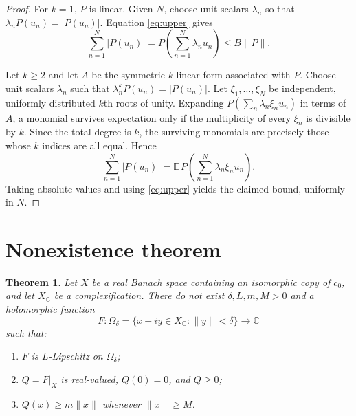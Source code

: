 \documentclass[11pt]{article}
\newtheorem{theorem}{Theorem}
\newcommand{\C}{\mathbb C}
\begin{document}
\begin{proof}
For $k=1$, $P$ is linear.  Given $N$, choose unit scalars $\lambda_n$ so that
$\lambda_nP(u_n)=|P(u_n)|$.  Equation \eqref{eq:upper} gives
\[
 \sum_{n=1}^N|P(u_n)|
 =P\left(\sum_{n=1}^N\lambda_nu_n\right)
 \le B\|P\|.
\]

Let $k\ge2$ and let $A$ be the symmetric $k$-linear form associated with
$P$.  Choose unit scalars $\lambda_n$ such that
$\lambda_n^kP(u_n)=|P(u_n)|$.  Let $\xi_1,\ldots,\xi_N$ be independent,
uniformly distributed $k$th roots of unity.  Expanding
$P(\sum_n\lambda_n\xi_nu_n)$ in terms of $A$, a monomial survives expectation
only if the multiplicity of every $\xi_n$ is divisible by $k$.  Since the
total degree is $k$, the surviving monomials are precisely those whose $k$
indices are all equal.  Hence
\[
 \sum_{n=1}^N|P(u_n)|
 =\mathbb E\,P\left(\sum_{n=1}^N\lambda_n\xi_nu_n\right).
\]
Taking absolute values and using \eqref{eq:upper} yields the claimed bound,
uniformly in $N$.
\end{proof}

\section{Nonexistence theorem}

\begin{theorem}\label{thm:main}
Let $X$ be a real Banach space containing an isomorphic copy of $c_0$, and
let $X_{\C}$ be a complexification.  There do not exist
$\delta,L,m,M>0$ and a holomorphic function
\[
 F:\Omega_\delta=\{x+iy\in X_{\C}:\|y\|<\delta\}\longrightarrow\C
\]
such that:
\begin{enumerate}[label=\textup{(\roman*)}]
\item $F$ is $L$-Lipschitz on $\Omega_\delta$;
\item $Q=F|_X$ is real-valued, $Q(0)=0$, and $Q\ge0$;
\item $Q(x)\ge m\|x\|$ whenever $\|x\|\ge M$.
\end{enumerate}
\end{theorem}
\end{document}

